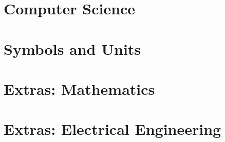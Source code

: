 \documentclass{article}
\begin{document}
\newpage
\section{Computer Science}
\label{sec:compsci}

    {  }

\newpage
\section{Symbols and Units}
\label{sec:units}

    {  }

\newpage
{}

\section{Extras: Mathematics}%
\label{sec:extrasec-math}

    {  }

\newpage
\section{Extras: Electrical Engineering}%
\label{sec:extrasec-ee}

    {  }
\end{document}
